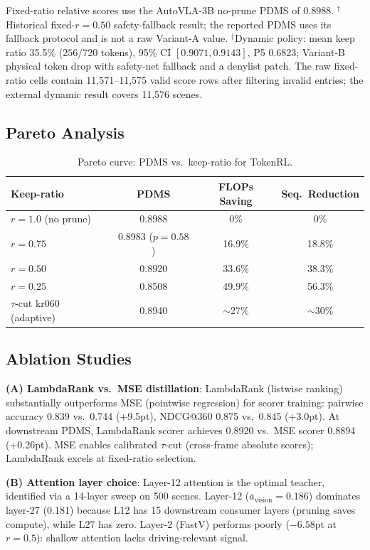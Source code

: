 \documentclass[letterpaper]{article} %
\newcommand{\ours}{TokenRL}
\begin{document}
\begin{table}[t]
{\scriptsize Fixed-ratio relative scores use the AutoVLA-3B no-prune PDMS of 0.8988. $^{\dagger}$Historical fixed-$r{=}0.50$ safety-fallback result; the reported PDMS uses its fallback protocol and is not a raw Variant-A value. $^{\ddagger}$Dynamic policy: mean keep ratio 35.5\% ($256/720$ tokens), 95\% CI $[0.9071,0.9143]$, P5 0.6823; Variant-B physical token drop with safety-net fallback and a denylist patch. The raw fixed-ratio cells contain 11,571--11,575 valid score rows after filtering invalid entries; the external dynamic result covers 11,576 scenes.}
\end{table}

\subsection{Pareto Analysis}

\begin{table}[t]
\centering
\caption{Pareto curve: PDMS vs.\ keep-ratio for \ours{}.}
\label{tab:pareto}
\small
\begin{tabular}{lccc}
\toprule
\textbf{Keep-ratio} & \textbf{PDMS} & \textbf{FLOPs Saving} & \textbf{Seq.\ Reduction} \\
\midrule
$r=1.0$ (no prune) & 0.8988 & 0\% & 0\% \\
$r=0.75$ & 0.8983 ($p{=}0.58$) & 16.9\% & 18.8\% \\
$r=0.50$ & 0.8920 & 33.6\% & 38.3\% \\
$r=0.25$ & 0.8508 & 49.9\% & 56.3\% \\
$\tau$-cut kr060 (adaptive) & 0.8940 & ${\sim}$27\% & ${\sim}$30\% \\
\bottomrule
\end{tabular}
\end{table}

\subsection{Ablation Studies}
\label{sec:exp_ablation}

\textbf{(A) LambdaRank vs.\ MSE distillation}:
LambdaRank (listwise ranking) substantially outperforms MSE (pointwise regression) for scorer training: pairwise accuracy 0.839 vs.\ 0.744 (+9.5pt), NDCG@360 0.875 vs.\ 0.845 (+3.0pt).
At downstream PDMS, LambdaRank scorer achieves 0.8920 vs.\ MSE scorer 0.8894 (+0.26pt).
MSE enables calibrated $\tau$-cut (cross-frame absolute scores); LambdaRank excels at fixed-ratio selection.

\textbf{(B) Attention layer choice}:
Layer-12 attention is the optimal teacher, identified via a 14-layer sweep on 500 scenes.
Layer-12 ($\bar{a}_\text{vision}{=}0.186$) dominates layer-27 ($0.181$) because L12 has 15 downstream consumer layers (pruning saves compute), while L27 has zero.
Layer-2 (FastV) performs poorly ($-6.58$pt at $r{=}0.5$): shallow attention lacks driving-relevant signal.
\end{document}
